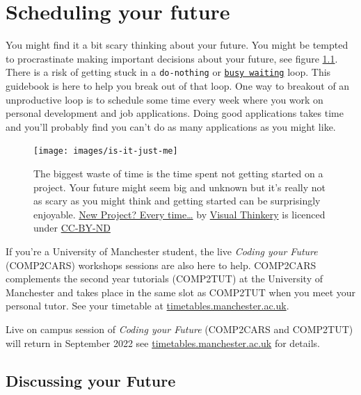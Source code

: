 \documentclass[
]{book}
\begin{document}
\hypertarget{scheduling}{%
\chapter{Scheduling your future}\label{scheduling}}

You might find it a bit scary thinking about your future. You might be tempted to procrastinate making important decisions about your future, see figure \ref{fig:schedule-fig}. There is a risk of getting stuck in a \texttt{do-nothing} or \href{https://en.wikipedia.org/wiki/Busy_waiting}{\texttt{busy\ waiting}} loop. This guidebook is here to help you break out of that loop. One way to breakout of an unproductive loop is to schedule some time every week where you work on personal development and job applications. Doing good applications takes time and you'll probably find you can't do as many applications as you might like.

\begin{figure}

{\centering \texttt{[image: images/is-it-just-me]} 

}

\caption{The biggest waste of time is the time spent not getting started on a project. Your future might seem big and unknown but it's really not as scary as you might think and getting started can be surprisingly enjoyable. \href{https://bryanmmathers.com/new-project-every-time/}{New Project? Every time\ldots{}} by \href{https://visualthinkery.com/}{Visual Thinkery} is licenced under \href{https://creativecommons.org/licenses/by-nd/4.0/}{CC-BY-ND}}\label{fig:schedule-fig}
\end{figure}



If you're a University of Manchester student, the live \emph{Coding your Future} (COMP2CARS) workshops sessions are also here to help.
COMP2CARS complements the second year tutorials (COMP2TUT) at the University of Manchester and takes place in the same slot as COMP2TUT when you meet your personal tutor. See your timetable at \href{https://timetables.manchester.ac.uk/}{timetables.manchester.ac.uk}.

Live on campus session of \emph{Coding your Future} (COMP2CARS and COMP2TUT) will return in September 2022 see \href{https://timetables.manchester.ac.uk/}{timetables.manchester.ac.uk} for details.

\hypertarget{discussing-your-future}{%
\section{Discussing your Future}\label{discussing-your-future}}
\end{document}
